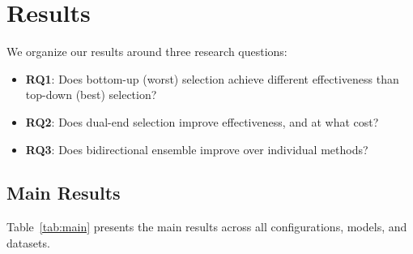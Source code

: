 \section{Results}
\label{sec:results}

We organize our results around three research questions:
\begin{itemize}[leftmargin=*]
\item \textbf{RQ1}: Does bottom-up (worst) selection achieve different effectiveness than top-down (best) selection?
\item \textbf{RQ2}: Does dual-end selection improve effectiveness, and at what cost?
\item \textbf{RQ3}: Does bidirectional ensemble improve over individual methods?
\end{itemize}

\subsection{Main Results}

Table~\ref{tab:main} presents the main results across all configurations, models, and datasets.

